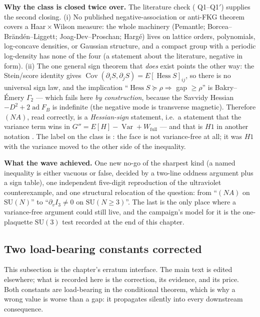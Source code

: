 \textbf{Why the class is closed twice over.} The literature check ( Q1--Q1$'$)
supplies the second closing. (i) No published negative-association or anti-FKG theorem covers a
Haar\,$\times$\,Wilson measure: the whole machinery (Pemantle; Borcea--Br\"and\'en--Liggett;
Joag-Dev--Proschan; Harg\'e) lives on lattice orders, polynomials, log-concave densities, or
Gaussian structure, and a compact group with a periodic log-density has none of the four \LT{} (a
statement about the literature, negative in form). (ii) The one general sign theorem that
\emph{does} exist points the other way: the Stein/score identity gives
$\operatorname{Cov}(\partial_iS,\partial_jS)=E[\operatorname{Hess}S]_{ij}$, so there is no
universal sign law, and the implication ``$\operatorname{Hess}S\succeq\rho\Rightarrow$ gap
$\ge\rho$'' is Bakry--\'Emery $\Gamma_2$ --- which fails here \emph{by construction}, because the
Savvidy Hessian $-D^2+2\operatorname{ad}F_B$ is indefinite (the negative mode is transverse
magnetic). Therefore $(NA)$, read correctly, is a \emph{Hessian-sign} statement, i.e.\ a statement
that the variance term wins in $G''=E[H]-\operatorname{Var}+W_{\mathrm{full}}$ --- and that is $H1$
in another notation \LC. The label on the class is \LN: the face is not variance-free at all; it
was $H1$ with the variance moved to the other side of the inequality.

\textbf{What the wave achieved.} One new no-go of the sharpest kind (a named inequality is either
vacuous or false, decided by a two-line oddness argument plus a sign table), one independent
five-digit reproduction of the ultraviolet counterexample, and one structural relocation of the
question: from ``$(NA)$ on $\mathrm{SU}(N)$'' to ``$\partial_vI_3\neq0$ on $\mathrm{SU}(N\ge3)$''.
The last is the only place where a variance-free argument could still live, and the campaign's
model for it is the one-plaquette $\mathrm{SU}(3)$ test recorded at the end of this chapter.

\subsection{Two load-bearing constants corrected}

This subsection is the chapter's erratum interface. The main text is edited elsewhere; what is
recorded here is the correction, its evidence, and its price. Both constants are load-bearing in the
conditional theorem, which is why a wrong value is worse than a gap: it propagates silently into
every downstream consequence.

